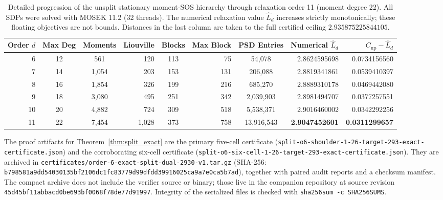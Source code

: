 \documentclass[aps,prx,reprint,nofootinbib,longbibliography,floatfix]{revtex4-2}
\theoremstyle{plain}
\theoremstyle{remark}
\newcommand{\fp}{/\allowbreak}
\begin{document}
\begin{sloppypar}
\begin{table}[t]
\centering
\caption{Detailed progression of the unsplit stationary moment-SOS hierarchy through relaxation order 11 (moment degree 22). All SDPs were solved with MOSEK 11.2 (32 threads). The numerical relaxation value $\widehat{L}_d$ increases strictly monotonically; these floating objectives are not bounds. Distances in the last column are taken to the full certified ceiling $2.935875225844105$.}
\label{tab:sos_progression}
\vspace{0.3em}
\footnotesize
\setlength{\tabcolsep}{3.5pt}
\begin{tabular*}{\textwidth}{@{\extracolsep{\fill}}rccrcrcrr@{}}
\toprule
Order $d$ & Max Deg & Moments & Liouville & Blocks & Max Block & PSD Entries & Numerical $\widehat{L}_d$ & $C_{\mathrm{up}}-\widehat L_d$ \\
\midrule
6  & 12 & 561   & 120   & 113 & 75  & 54,078     & 2.8624595698 & 0.0734156560 \\
7  & 14 & 1,054 & 203   & 153 & 131 & 206,088    & 2.8819341861 & 0.0539410397 \\
8  & 16 & 1,854 & 326   & 199 & 216 & 685,270    & 2.8889310178 & 0.0469442080 \\
9  & 18 & 3,080 & 495   & 251 & 342 & 2,039,903  & 2.8981494707 & 0.0377257551 \\
10 & 20 & 4,882 & 724   & 309 & 518 & 5,538,371  & 2.9016460002 & 0.0342292256 \\
11 & 22 & 7,454 & 1,028 & 373 & 758 & 13,916,543 & \textbf{2.9047452601} & \textbf{0.0311299657} \\
\bottomrule
\end{tabular*}
\end{table}

The proof artifacts for Theorem~\ref{thm:split_exact} are the primary five-cell certificate (\texttt{split-o6-shoulder-1-26-target-293-exact-certificate.json}) and the corroborating six-cell certificate (\texttt{split-o6-six-cell-1-26-target-293-exact-certificate.json}). They are archived in \texttt{certificates\fp order-6-exact-split-dual-2930-v1.tar.gz} (SHA-256: \texttt{b798581a\allowbreak 9dd54030\allowbreak 135bf210\allowbreak 6dc1fc83\allowbreak 779d99df\allowbreak dd399160\allowbreak 25ca9a7e\allowbreak 0ca5b7ad}), together with paired audit reports and a checksum manifest. The compact archive does not include the verifier source or binary; those live in the companion repository at source revision \texttt{45d45bf11abbacd0be693bf0068f78de77d91997}. Integrity of the serialized files is checked with \texttt{sha256sum -c SHA256SUMS}.


\end{sloppypar}
\end{document}
